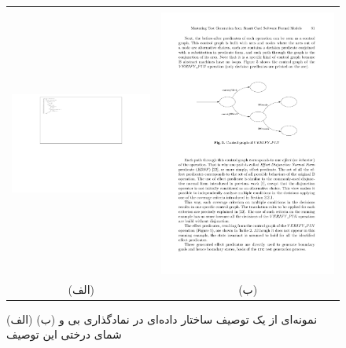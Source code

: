 \begin{figure}
    \begin{center}
    \begin{tabular}{| c | c |}
      	\hline
	 & \\
	\includegraphics[width=7cm]{3-RelatedWork/Figures/LTGSampleA.pdf} &
         \includegraphics[width=9cm]{3-RelatedWork/Figures/LTGSampleB.pdf} 
 	\\
         (الف) & (ب) \\
	\hline
    \end{tabular}
    \end{center}
    \caption{\label{fig:LTGSample}(الف) نمونه‌ای از یک توصیف ساختار داده‌ای در نمادگذاری بی و (ب) شمای درختی این توصیف}
\end{figure}

